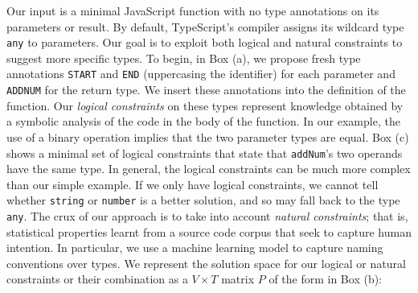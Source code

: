 \documentclass[sigplan,10pt,review,anonymous]{acmart} %
\theoremstyle{plain}
\theoremstyle{remark}
\theoremstyle{definition}
\begin{document}
\begin{figure*}
	\centering
	\def\svgwidth{0.75\linewidth}
	


	\vspace{1em}
	\begin{minipage}{\textwidth}
		Our input is a minimal JavaScript function
		with no type annotations on its parameters or result.
		By default, TypeScript's compiler assigns its wildcard type \lstinline+any+ to
		parameters.
		Our goal is to exploit both logical and natural constraints to suggest
		more specific types.
		To begin, in Box (a), we propose fresh type annotations  \textcolor{mygreen}{\texttt{START}} and \textcolor{mygreen}{\texttt{END}} (uppercasing the identifier) for each parameter and \textcolor{mygreen}{\texttt{ADDNUM}} for the return type.
		We insert these annotations into the definition of the function.
		Our \emph{logical constraints} on these types represent knowledge obtained
		by a symbolic analysis of the code in the body of the function.
		In our example, the use of a binary operation implies that the two parameter types are equal.
		Box (c) shows a minimal set of logical constraints that state
		that \lstinline+addNum+'s two operands have the same type.
		In general, the logical constraints can be much more complex than our simple example.
		If we only have logical constraints, we cannot tell
		whether \lstinline{string} or \lstinline{number} is a better solution,
		and so may fall back to the type \lstinline{any}.
		The crux of our approach is to take into account \emph{natural constraints};
		that is, statistical properties learnt from a source code corpus that seek to
		capture human intention.
		In particular, we use a machine learning model to capture naming conventions over types.
		We represent the solution space for our logical or natural constraints
		or their combination
		as a $V \times T$ matrix $P$ of the form in Box (b):

\end{minipage}
\end{figure*}
\end{document}
